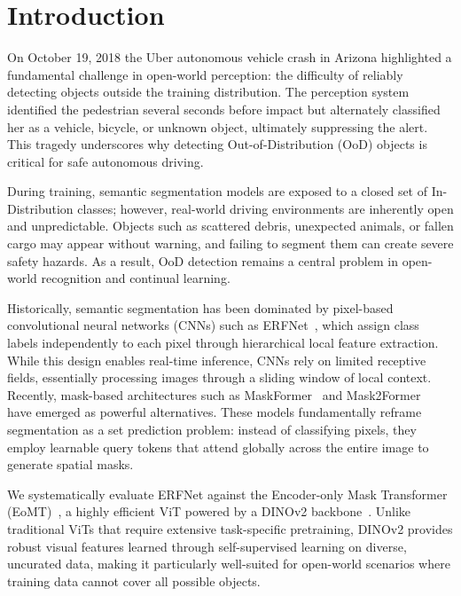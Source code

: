 \section{Introduction}
\label{sec:intro}

On October 19, 2018 the Uber autonomous vehicle crash in Arizona highlighted a fundamental challenge in open-world perception: the difficulty of reliably detecting objects outside the training distribution. The perception system identified the pedestrian several seconds before impact but alternately classified her as a vehicle, bicycle, or unknown object, ultimately suppressing the alert. This tragedy underscores why detecting Out-of-Distribution (OoD) objects is critical for safe autonomous driving.

During training, semantic segmentation models are exposed to a closed set of In-Distribution classes; however, real-world driving environments are inherently open and unpredictable. Objects such as scattered debris, unexpected animals, or fallen cargo may appear without warning, and failing to segment them can create severe safety hazards. As a result, OoD detection remains a central problem in open-world recognition and continual learning.

Historically, semantic segmentation has been dominated by pixel-based convolutional neural networks (CNNs) such as ERFNet~\cite{romera2018erfnet}, which assign class labels independently to each pixel through hierarchical local feature extraction. While this design enables real-time inference, CNNs rely on limited receptive fields, essentially processing images through a sliding window of local context. Recently, mask-based architectures such as MaskFormer~\cite{cheng2021maskformer} and Mask2Former~\cite{cheng2022mask2former} have emerged as powerful alternatives. These models fundamentally reframe segmentation as a set prediction problem: instead of classifying pixels, they employ learnable query tokens that attend globally across the entire image to generate spatial masks.

We systematically evaluate ERFNet against the Encoder-only Mask Transformer (EoMT)~\cite{kerssies2025eomt}, a highly efficient ViT powered by a DINOv2 backbone~\cite{oquab2023dinov2}. Unlike traditional ViTs that require extensive task-specific pretraining, DINOv2 provides robust visual features learned through self-supervised learning on diverse, uncurated data, making it particularly well-suited for open-world scenarios where training data cannot cover all possible objects.

